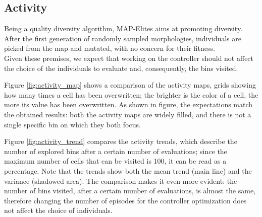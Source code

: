 \subsection{Activity}
Being a quality diversity algorithm, MAP-Elites aims at promoting diversity.\\
After the first generation of randomly sampled morphologies, individuals are picked from the map and mutated, with no concern for their fitness.\\
Given these premises, we expect that working on the controller should not affect the choice of the individuals to evaluate and, consequently, the bins visited.

Figure \ref{fig:activity_map} shows a comparison of the activity maps, grids showing how many times a cell has been overwritten; the brighter is the color of a cell, the more its value has been overwritten.
As shown in figure, the expectations match the obtained results: both the activity maps are widely filled, and there is not a single specific bin on which they both focus.

Figure \ref{fig:activity_trend} compares the activity trends, which describe the number of explored bins after a certain number of evaluations; since the maximum number of cells that can be visited is 100, it can be read as a percentage. Note that the trends show both the mean trend (main line) and the variance (shadowed area).
The comparison makes it even more evident: the number of bins visited, after a certain number of evaluations, is almost the same, therefore changing the number of episodes for the controller optimization does not affect the choice of individuals.

